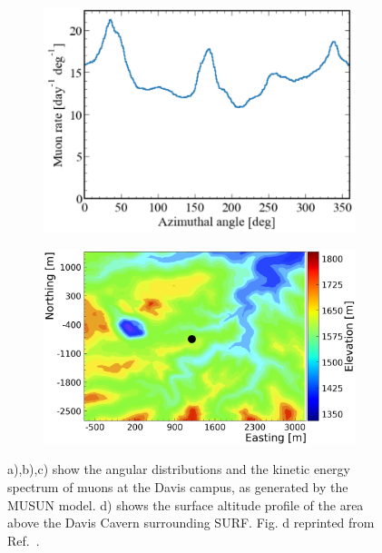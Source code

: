 \begin{figure}[h!]
\begin{subfigure}[c]{0.49\textwidth}
        \includegraphics[width=\textwidth]{figures/Muons/Azimuthal.pdf}
        \caption{}
        \label{fig:Muons/azi}
    \end{subfigure}
    \begin{subfigure}[c]{0.49\textwidth}   
        \centering 
        \includegraphics[width=\textwidth]{figures/Muons/SurfMapTrimmed.png}
        \caption{} 
        \label{fig:Muons/SurfaceProfile}
    \end{subfigure}
    \caption[Angular distributions and the kinetic energy spectrum of muons at the Davis campus, as generated by the MUSUN model alongside the surface altitude profile.]{a),b),c) show the angular distributions and the kinetic energy spectrum of muons at the Davis campus, as generated by the MUSUN model. d) shows the surface altitude profile of the area above the Davis Cavern surrounding SURF. Fig. d reprinted from Ref.~\cite{LZ_SIMS}.} 
    \label{fig:Muons/Prime_info}
\end{figure}


